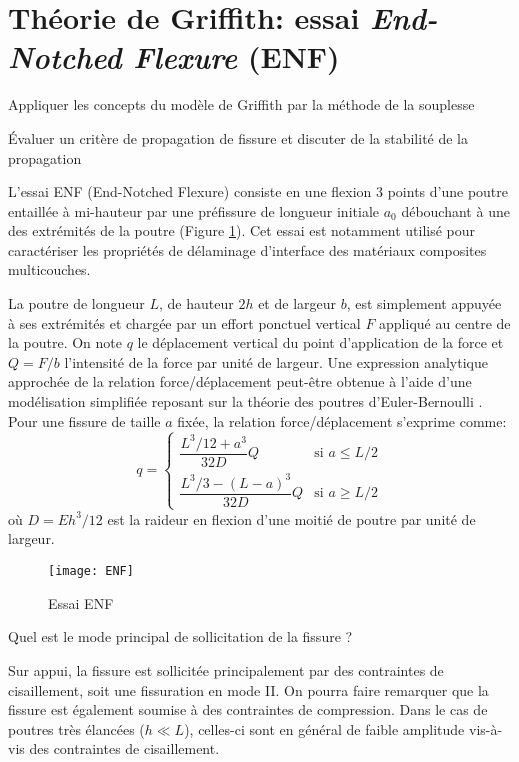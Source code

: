 \section{Théorie de Griffith: essai \textit{End-Notched Flexure} (ENF)}

\begin{objectifs}
\item Appliquer les concepts du modèle de Griffith par la méthode de la souplesse
\item \'Evaluer un critère de propagation de fissure et discuter de la stabilité de la propagation 
\end{objectifs}

L'essai ENF (End-Notched Flexure) consiste en une flexion 3 points d'une poutre entaillée à mi-hauteur par une préfissure de longueur initiale $a_0$ débouchant à une des extrémités de la poutre (Figure \ref{fig:ENF}). Cet essai est notamment utilisé pour caractériser les propriétés de délaminage d'interface des matériaux composites multicouches.

La poutre de longueur $L$, de hauteur $2h$ et de largeur $b$, est simplement appuyée à ses extrémités et chargée par un effort ponctuel vertical $F$ appliqué au centre de la poutre. On note $q$ le déplacement vertical du point d'application de la force et $Q = F/b$ l'intensité de la force par unité de largeur. Une expression analytique approchée de la relation force/déplacement peut-être obtenue à l'aide d'une modélisation simplifiée reposant sur la théorie des poutres d'Euler-Bernoulli \cite{allix1995damage}. Pour une fissure de taille $a$ fixée, la relation force/déplacement s'exprime comme:
\begin{equation}
q = \begin{cases}
\dfrac{L^3/12 + a^3}{32D}Q & \text{si } a\leq L/2\\
\dfrac{L^3/3 - (L-a)^3}{32D}Q & \text{si } a\geq L/2
\end{cases}
\end{equation}
où $D = E h^3/12$ est la raideur en flexion d'une moitié de poutre par unité de largeur.


\begin{figure}[h]
\begin{center}
\texttt{[image: ENF]}
\end{center}
\caption{Essai ENF}\label{fig:ENF}
\end{figure}

\begin{questions}
\question Quel est le mode principal de sollicitation de la fissure ?
\begin{solution}
Sur appui, la fissure est sollicitée principalement par des contraintes de cisaillement, soit une fissuration en mode II. On pourra faire remarquer que la fissure est également soumise à des contraintes de compression. Dans le cas de poutres très élancées ($h \ll L$), celles-ci sont en général de faible amplitude vis-à-vis des contraintes de cisaillement.
\end{solution}
\end{questions}

